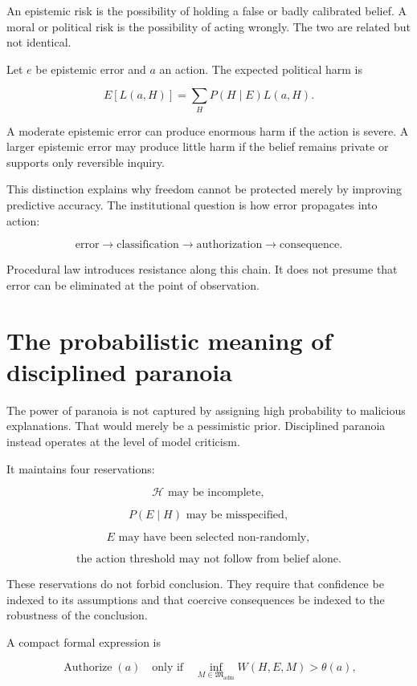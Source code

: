 An epistemic risk is the possibility of holding a false or badly calibrated belief. A moral or political risk is the possibility of acting wrongly. The two are related but not identical.

Let \(e\) be epistemic error and \(a\) an action. The expected political harm is

\[
E[L(a,H)]
=
\sum_H
P(H\mid E)L(a,H).
\]

A moderate epistemic error can produce enormous harm if the action is severe. A larger epistemic error may produce little harm if the belief remains private or supports only reversible inquiry.

This distinction explains why freedom cannot be protected merely by improving predictive accuracy. The institutional question is how error propagates into action:

\[
\text{error}
\to
\text{classification}
\to
\text{authorization}
\to
\text{consequence}.
\]

Procedural law introduces resistance along this chain. It does not presume that error can be eliminated at the point of observation.

\section{The probabilistic meaning of disciplined paranoia}
\label{sec:a64}

The power of paranoia is not captured by assigning high probability to malicious explanations. That would merely be a pessimistic prior. Disciplined paranoia instead operates at the level of model criticism.

It maintains four reservations:

\[
\mathcal H\text{ may be incomplete},
\]

\[
P(E\mid H)\text{ may be misspecified},
\]

\[
E\text{ may have been selected non-randomly},
\]

\[
\text{the action threshold may not follow from belief alone}.
\]

These reservations do not forbid conclusion. They require that confidence be indexed to its assumptions and that coercive consequences be indexed to the robustness of the conclusion.

A compact formal expression is

\[
\operatorname{Authorize}(a)
\quad\text{only if}\quad
\inf_{M\in\mathfrak M_{\mathrm{adm}}}
W(H,E,M)
>
\theta(a),
\]

